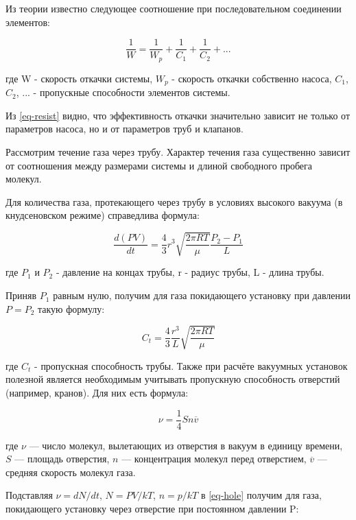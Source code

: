 \documentclass[a4paper,12pt]{article}
\begin{document}
Из теории известно следующее соотношение при последовательном соединении элементов:

\begin{equation}\label{eq-resist}
\frac{1}{W} = \frac{1}{W_p} + \frac{1}{C_1} + \frac{1}{C_2} + ... 
\end{equation}

где W - скорость откачки системы, $W_p$ - скорость откачки собственно насоса, $C_1$, $C_2$, ... - пропускные способности элементов системы.

Из \ref{eq-resist} видно, что эффективность откачки значительно зависит не только от параметров насоса, но и от параметров труб и клапанов.

Рассмотрим течение газа через трубу. Характер течения газа существенно зависит от соотношения между размерами системы и длиной свободного пробега молекул.

Для количества газа, протекающего через трубу в условиях высокого вакуума (в кнудсеновском режиме) справедлива формула:

\begin{equation}\label{eq-flowing}
\frac{d(PV)}{dt} = \frac{4}{3} r^3 \sqrt{\frac{2\pi RT}{\mu}} \frac{P_2-P_1}{L}
\end{equation}

где $P_1$ и $P_2$ - давление на концах трубы, r - радиус трубы, L - длина трубы.

Приняв $P_1$ равным нулю, получим для газа покидающего установку при давлении $P = P_2$ такую формулу:

\begin{equation}\label{eq-tube-resist}
C_t = \frac{4}{3} \frac{r^3}{L}\sqrt{\frac{2\pi RT}{\mu}} 
\end{equation}

где $C_t$ - пропускная способность трубы. Также при расчёте вакуумных установок полезной является необходимым учитывать пропускную способность отверстий (например, кранов). Для них есть формула:

\begin{equation}\label{eq-hole}
\nu = \frac{1}{4}Sn\overline{v}
\end{equation}

где $\nu$ — число молекул, вылетающих из отверстия в вакуум в единицу
времени, $S$ — площадь отверстия, $n$ — концентрация молекул перед отверстием, $\overline{v}$ — средняя скорость молекул газа.

Подставляя $\nu = dN/dt$, $N = PV/kT$, $n = p/kT$ в \ref{eq-hole} получим для газа, покидающего установку через отверстие при постоянном давлении P:
\end{document}
